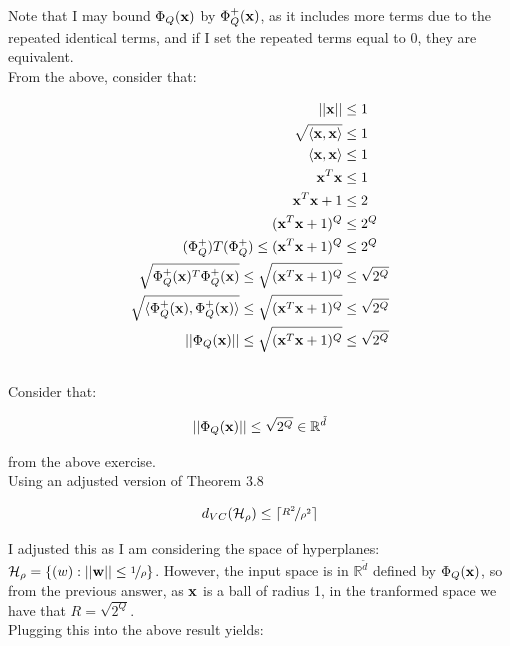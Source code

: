 \documentclass{scrartcl}
\begin{document}
Note that I may bound $\Phi_Q({\mathbf x})$ by $\Phi^+_Q({\mathbf x})$, as it includes more terms due to the repeated identical terms, and if I set the repeated terms equal to 0, they are equivalent. \\

From the above, consider that:

\begin{align*}
    || {\mathbf x} || &\leq 1 \\
    \sqrt{ \langle {\mathbf x}, {\mathbf x} \rangle } &\leq 1 \\
    \langle {\mathbf x}, {\mathbf x} \rangle &\leq 1 \\
    {\mathbf x}^T {\mathbf x} &\leq 1 \\
    {\mathbf x}^T {\mathbf x} + 1 &\leq 2 \\
    ({\mathbf x}^T {\mathbf x} + 1)^Q &\leq 2^Q \\
    (\Phi_Q^+)T(\Phi_Q^+) \leq ({\mathbf x}^T {\mathbf x} + 1)^Q &\leq 2^Q \\
    \sqrt{\Phi_Q^+({\mathbf x})^T\Phi_Q^+({\mathbf x})} \leq \sqrt{ ({\mathbf x}^T {\mathbf x} + 1)^Q} &\leq \sqrt{2^Q} \\
    \sqrt{\langle \Phi_Q^+({\mathbf x}), \Phi_Q^+({\mathbf x}) \rangle} \leq \sqrt{ ({\mathbf x}^T {\mathbf x} + 1)^Q} &\leq \sqrt{2^Q} \\
    || \Phi_Q({\mathbf x}) || \leq \sqrt{ ({\mathbf x}^T {\mathbf x} + 1)^Q} &\leq \sqrt{2^Q} \\
\end{align*}

\subsection{}

Consider that:

\[
|| \Phi_Q({\mathbf x}) || \leq \sqrt{ 2^Q } \in \mathbb{R}^{\tilde{d}}
\]

from the above exercise.\\

Using an adjusted version of Theorem 3.8 \cite[p. 18]{mln}

\[ d_{VC} (\mathcal{H}_\rho) \leq \lceil \nicefrac{R^2} {\rho^2} \rceil \]

I adjusted this as I am considering the space of hyperplanes: $ \mathcal{H}_\rho = \{ (w) : || {\mathbf w} || \leq \nicefrac {1} {\rho} \}$. However, the input space is in $\mathbb{R}^{\tilde{d}}$ defined by $\Phi_Q ({\mathbf x})$, so from the previous answer, as ${\mathbf x}$ is a ball of radius 1, in the tranformed space we have that $R = \sqrt{ 2^Q }$.\\

Plugging this into the above result yields:
\end{document}
